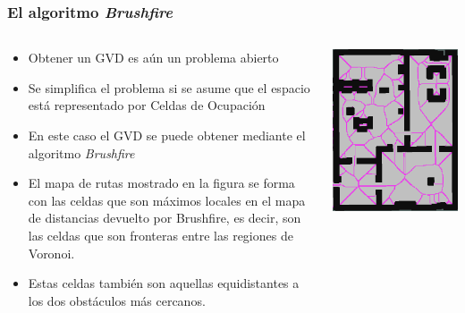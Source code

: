 \begin{frame}\frametitle{El algoritmo \textit{Brushfire}}
  \begin{columns}
    \begin{column}{0.65\textwidth}
      \begin{itemize}
      \item Obtener un GVD es aún un problema abierto
      \item Se simplifica el problema si se asume que el espacio está representado por Celdas de Ocupación
      \item En este caso el GVD se puede obtener mediante el algoritmo \textit{Brushfire}
      \item El mapa de rutas mostrado en la figura se forma con las celdas que son máximos locales en el mapa de distancias devuelto por Brushfire, es decir, son las celdas que son fronteras entre las regiones de Voronoi.
      \item Estas celdas también son aquellas equidistantes a los dos obstáculos más cercanos. 
      \end{itemize}
    \end{column}
    \begin{column}{0.35\textwidth}
      \includegraphics[width=\textwidth]{Figures/GVDFromGrid.png}
    \end{column}
  \end{columns}
\end{frame}

